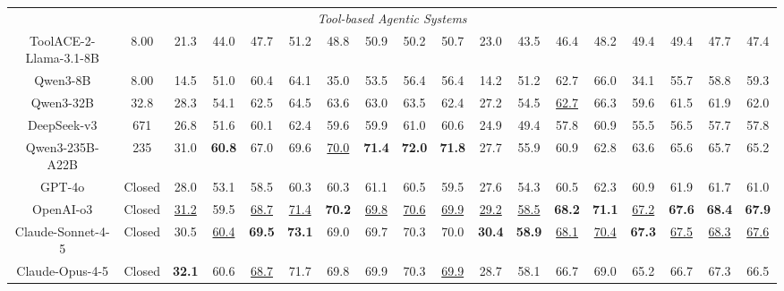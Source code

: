 \begin{table}[t]
{\begin{tabular}{cc|cccccccc|cccccccc}
\multicolumn{18}{c}{\cellcolor[HTML]{EFEFEF}\textit{Tool-based Agentic Systems}}                                  \\
ToolACE-2-Llama-3.1-8B        & 8.00 & 21.3 & 44.0 & 47.7 & 51.2 & 48.8 & 50.9 & 50.2 & 50.7 & 23.0 & 43.5 & 46.4 & 48.2 & 49.4 & 49.4 & 47.7 & 47.4 \\
Qwen3-8B                      & 8.00 & 14.5 & 51.0 & 60.4 & 64.1 & 35.0 & 53.5 & 56.4 & 56.4 & 14.2 & 51.2 & 62.7 & 66.0 & 34.1 & 55.7 & 58.8 & 59.3 \\
Qwen3-32B                     & 32.8 & 28.3 & 54.1 & 62.5 & 64.5 & 63.6 & 63.0 & 63.5 & 62.4 & 27.2 & 54.5 & \underline{62.7} & 66.3 & 59.6 & 61.5 & 61.9 & 62.0 \\
DeepSeek-v3                   & 671 & 26.8 & 51.6 & 60.1 & 62.4 & 59.6 & 59.9 & 61.0 & 60.6 & 24.9 & 49.4 & 57.8 & 60.9 & 55.5 & 56.5 & 57.7 & 57.8 \\
Qwen3-235B-A22B               & 235 & 31.0 & \textbf{60.8} & 67.0 & 69.6 & \underline{70.0} & \textbf{71.4} & \textbf{72.0} & \textbf{71.8} & 27.7 & 55.9 & 60.9 & 62.8 & 63.6 & 65.6 & 65.7 & 65.2 \\
GPT-4o                        & Closed & 28.0 & 53.1 & 58.5 & 60.3 & 60.3 & 61.1 & 60.5 & 59.5 & 27.6 & 54.3 & 60.5 & 62.3 & 60.9 & 61.9 & 61.7 & 61.0 \\
OpenAI-o3                     & Closed & \underline{31.2} & 59.5 & \underline{68.7} & \underline{71.4} & \textbf{70.2} & \underline{69.8} & \underline{70.6} & \underline{69.9} & \underline{29.2} & \underline{58.5} & \textbf{68.2} & \textbf{71.1} & \underline{67.2} & \textbf{67.6} & \textbf{68.4} & \textbf{67.9} \\
Claude-Sonnet-4-5             & Closed & 30.5 & \underline{60.4} & \textbf{69.5} & \textbf{73.1} & 69.0 & 69.7 & 70.3 & 70.0 & \textbf{30.4} & \textbf{58.9} & \underline{68.1} & \underline{70.4} & \textbf{67.3} & \underline{67.5} & \underline{68.3} & \underline{67.6} \\
Claude-Opus-4-5               & Closed & \textbf{32.1} & 60.6 & \underline{68.7} & 71.7 & 69.8 & 69.9 & 70.3 & \underline{69.9} & 28.7 & 58.1 & 66.7 & 69.0 & 65.2 & 66.7 & 67.3 & 66.5 \\ \hline
   \bottomrule
\end{tabular}}
\end{table}